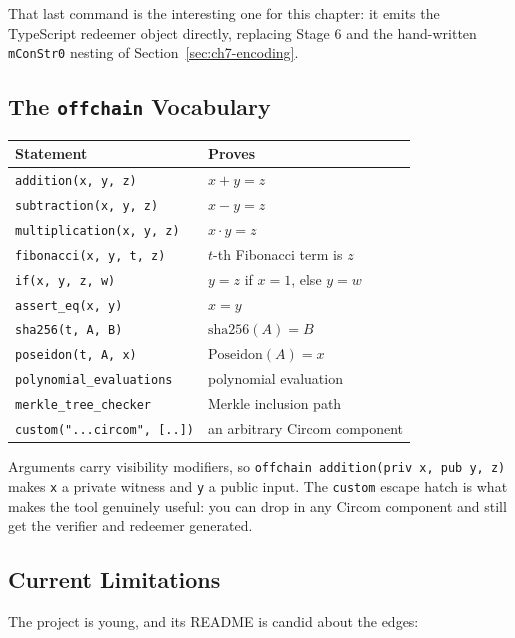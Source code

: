 That last command is the interesting one for this chapter: it emits the
TypeScript redeemer object directly, replacing Stage 6 and the hand-written
\texttt{mConStr0} nesting of Section~\ref{sec:ch7-encoding}.

\subsection*{The \texttt{offchain} Vocabulary}

\begin{center}
\begin{tabular}{ll}
  \hline
  \textbf{Statement} & \textbf{Proves} \\
  \hline
  \texttt{addition(x, y, z)}        & $x + y = z$ \\
  \texttt{subtraction(x, y, z)}     & $x - y = z$ \\
  \texttt{multiplication(x, y, z)}  & $x \cdot y = z$ \\
  \texttt{fibonacci(x, y, t, z)}    & $t$-th Fibonacci term is $z$ \\
  \texttt{if(x, y, z, w)}           & $y = z$ if $x=1$, else $y = w$ \\
  \texttt{assert\_eq(x, y)}         & $x = y$ \\
  \texttt{sha256(t, A, B)}          & $\mathrm{sha256}(A) = B$ \\
  \texttt{poseidon(t, A, x)}        & $\mathrm{Poseidon}(A) = x$ \\
  \texttt{polynomial\_evaluations}  & polynomial evaluation \\
  \texttt{merkle\_tree\_checker}    & Merkle inclusion path \\
  \texttt{custom("...circom", [..])}& an arbitrary Circom component \\
  \hline
\end{tabular}
\end{center}

Arguments carry visibility modifiers, so \texttt{offchain addition(priv x, pub y, z)}
makes \texttt{x} a private witness and \texttt{y} a public input. The
\texttt{custom} escape hatch is what makes the tool genuinely useful: you can
drop in any Circom component and still get the verifier and redeemer generated.

\subsection*{Current Limitations}

The project is young, and its README is candid about the edges:

